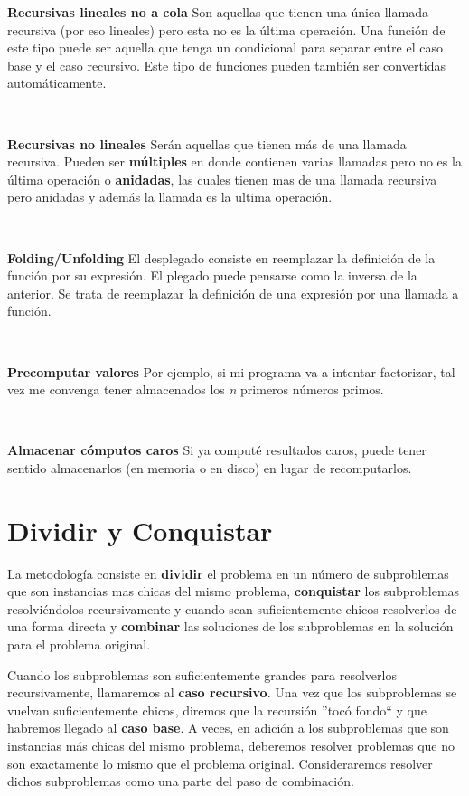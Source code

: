 \textbf{Recursivas lineales no a cola} Son aquellas que tienen una \'unica llamada recursiva (por eso lineales) pero esta no es la \'ultima operaci\'on. Una funci\'on de este tipo puede ser aquella que tenga un condicional para separar entre el caso base y el caso recursivo. Este tipo de funciones pueden tambi\'en ser convertidas autom\'aticamente.

~

\textbf{Recursivas no lineales} Ser\'an aquellas que tienen m\'as de una llamada recursiva. Pueden ser \textbf{m\'ultiples} en donde contienen varias llamadas pero no es la \'ultima operaci\'on o \textbf{anidadas}, las cuales tienen mas de una llamada recursiva pero anidadas y adem\'as la llamada es la ultima operaci\'on.

~

\textbf{Folding/Unfolding} El desplegado consiste en reemplazar la definici\'on de la funci\'on por su expresi\'on. El plegado puede pensarse como la inversa de la anterior. Se trata de reemplazar la definici\'on de una expresi\'on por una llamada a funci\'on.

~

\textbf{Precomputar valores} Por ejemplo, si mi programa va a intentar factorizar, tal vez me convenga tener almacenados los \textit{n} primeros n\'umeros primos.

~

\textbf{Almacenar c\'omputos caros} Si ya comput\'e resultados caros, puede tener sentido almacenarlos (en memoria o en disco) en lugar de recomputarlos.

\newpage
\section{Dividir y Conquistar}

La metodolog\'ia consiste en \textbf{dividir} el problema en un n\'umero de subproblemas que son instancias mas chicas del mismo problema, \textbf{conquistar} los subproblemas resolvi\'endolos recursivamente y cuando sean suficientemente chicos resolverlos de una forma directa y \textbf{combinar} las soluciones de los subproblemas en la soluci\'on para el problema original.

Cuando los subproblemas son suficientemente grandes para resolverlos recursivamente, llamaremos al \textbf{caso recursivo}. Una vez que los subproblemas se vuelvan suficientemente chicos, diremos que la recursi\'on ''toc\'o fondo`` y que habremos llegado al \textbf{caso base}. A veces, en adici\'on a los subproblemas que son instancias m\'as chicas del mismo problema, deberemos resolver problemas que no son exactamente lo mismo que el problema original. Consideraremos resolver dichos subproblemas como una parte del paso de combinaci\'on.

